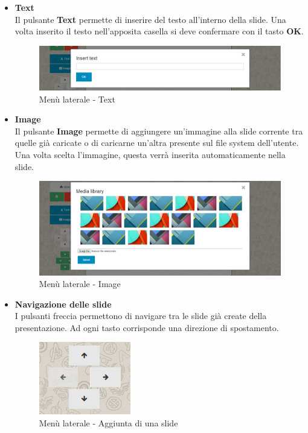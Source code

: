 \begin{itemize}
 \item \textbf{Text}\\
    Il pulsante \textbf{Text} permette di inserire del testo all'interno della \gls{slide}. Una volta inserito il testo nell'apposita casella si deve confermare con il tasto \textbf{OK}.
    \begin{figure}[H] 
	\centering 
	\includegraphics[scale=0.40] {img/editor_text.png}
	\caption{Menù laterale - Text} 
    \end{figure}
    
    
 \item \textbf{Image}\\
    Il pulsante \textbf{Image} permette di aggiungere un'immagine alla \gls{slide} corrente tra quelle già caricate o di caricarne un'altra presente sul file system dell'utente. Una volta scelta l'immagine, questa verrà inserita automaticamente nella \gls{slide}.
   \begin{figure}[H] 
	\centering 
	\includegraphics[scale=0.40] {img/editor_img.png}
	\caption{Menù laterale - Image} 
    \end{figure}
    
\newpage

  \item \textbf{Navigazione delle \gls{slide}}\\
  I pulsanti freccia permettono di navigare tra le \gls{slide} già create della presentazione. Ad ogni tasto corrisponde una direzione di spostamento.
  \begin{figure}[h] 
  	\centering 
  	\includegraphics[scale=0.80] {img/editor_move.png}
  	\caption{Menù laterale - Aggiunta di una slide} 
  \end{figure}
 

\end{itemize}
